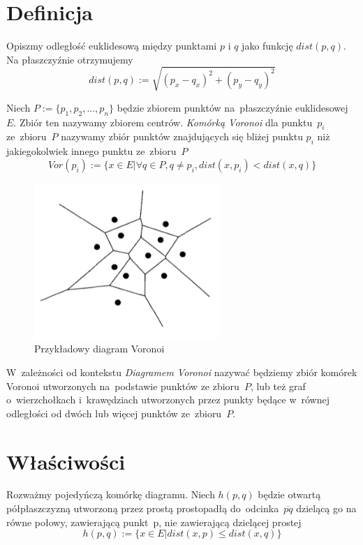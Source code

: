 \documentclass[skorowidz,autorrok,backref,xodstep,oswiadczenie]{wmimgr}
\begin{document}
\section{Definicja}

Opiszmy odległość euklidesową między punktami $p$ i $q$ jako funkcję $dist(p,q)$. Na płaszczyźnie otrzymujemy
\begin{equation}
dist(p,q) := \sqrt{( p_{x} - q_{x} )^2 + (p_{y} - q_{y})^2}
\end{equation}

Niech $P:=\{ p_{1},p_{2},...,p_{n} \}$ będzie zbiorem punktów na~płaszczyźnie euklidesowej $E$. Zbiór ten nazywamy zbiorem centrów. \emph{Komórką Voronoi} dla punktu~$p_{i}$ ze~zbioru~$P$ nazywamy zbiór punktów znajdujących się bliżej punktu $p_{i}$ niż jakiegokolwiek innego punktu ze~zbioru~$P$
\begin{equation}
Vor(p_{i}) := \{ x \in E | \forall q \in P, q \neq p_{i}, dist(x,p_{i}) < dist(x,q) \}
\end{equation}

\begin{figure}[ht!]
\centering
\includegraphics[width=70mm]{images/voronoi1.png}
\caption{Przykładowy diagram Voronoi}
\label{voronoidiagram}
\end{figure}

W~zależności od kontekstu \emph{Diagramem Voronoi} nazywać będziemy zbiór komórek Voronoi utworzonych na~podstawie punktów ze zbioru~$P$, lub też graf o~wierzchołkach i~krawędziach utworzonych przez punkty będące w~równej odległości od dwóch lub więcej punktów ze~zbioru~$P$.

\section{Właściwości}

Rozważmy pojedyńczą komórkę diagramu. Niech $h(p,q)$ będzie otwartą półpłaszczyzną utworzoną przez prostą prostopadłą do~odcinka~$\overline{pq}$ dzielącą go na równe połowy, zawierającą punkt~p, nie zawierającą dzielącej prostej
\begin{equation}
h(p,q) := \{ x \in E | dist(x,p) \leq dist(x,q) \}
\end{equation}
\end{document}
